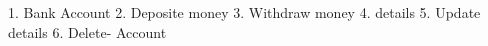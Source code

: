 
1. Bank Account
2. Deposite money
3. Withdraw money
4. details
5. Update details
6. Delete- Account